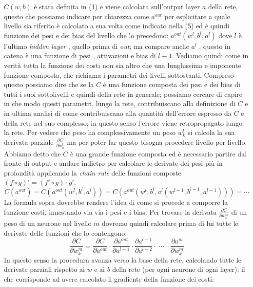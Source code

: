 $C(w,b)$ è stata definita in (1) e viene calcolata sull'output layer $a$ della rete, questo che possiamo indicare per chiarezza come $a^{out}$ per esplicitare a quale livello sia riferito è calcolato a sua volta come indicato nella (5) ed   è quindi funzione dei pesi e dei bias del livello che lo precedono: $ a^{out}(w^{l},b^{l}, a^{l})$ dove $l$ è l'ultimo \textit{hidden layer} , quello prima di \textit{out}; ma compare anche $a^{l}$ , questo in catena è una funzione di pesi , attivazioni e bias di $l-1$. Vediamo quindi come in verità tutta la funzione dei costi non sia altro che una lunghissima e imponente funzione composta, che richiama i parametri dei livelli sottostanti. Compreso questo possiamo dire che se la $C$ è una funzione composta dei pesi e dei bias di tutti i suoi sottolivelli e quindi della rete in generale; possiamo cercare di capire in che modo questi parametri, lungo la rete, contribuiscano alla definizione di $C$ e in ultima analisi di come contribuiscano alla quantità dell'errore espresso da $C$ e della rete nel suo complesso; in questo senso l'errore viene retropropagato lungo la rete. Per vedere che peso ha complessivamente un peso $w_{k}^{l}$ si calcola la sua derivata parziale $\frac{\partial C}{\partial w_{k}^{l}}$ ma per poter far questo bisogna procedere livello per livello. Abbiamo detto che $C$ è una grande funzione composta ed è necessario partire dal fronte di output e andare indietro per calcolare le derivate dei pesi più in profondità applicando la \textit{chain rule} delle funzioni composte $(f \circ g)'=(f' \circ g) \cdot g' $.
\begin{equation}
	C(a^{out})= C( a^{out}(w^{l},b^{l}, a^{l})) = C( a^{out}(w^{l},b^{l}, a^{l}(w^{l-1},b^{l-1}, a^{l-1}))) = \cdots
\end{equation}
La formula sopra dovrebbe rendere l'idea di come si procede a comporre la funzione costi, innestando via via i pesi e i bias. Per trovare la derivata $\frac{\partial C}{\partial w_{k}^{m}} $ di un peso di un neurone nel livello $m$ dovremo quindi calcolare prima di lui tutte le derivate delle funzioni che lo contengono:
\begin{equation}
	\dfrac{\partial C}{\partial w_{k}^{m}} = \dfrac{\partial C}{\partial a^{out}}\cdot \dfrac{\partial a^{out}}{\partial a^{l-1}} \cdot \dfrac{\partial a^{l-1}}{\partial a^{l-2}}\cdot \; \cdots \; \cdot \dfrac{\partial a^{m}}{\partial w^{m}_{k}}
\end{equation} 
In questo senso la procedura avanza verso la base della rete, calcolando tutte le derivate parziali rispetto ai $w$ e ai $b$ della rete (per ogni neurone di ogni layer); il che corrisponde ad avere calcolato il gradiente della funzione dei costi:
